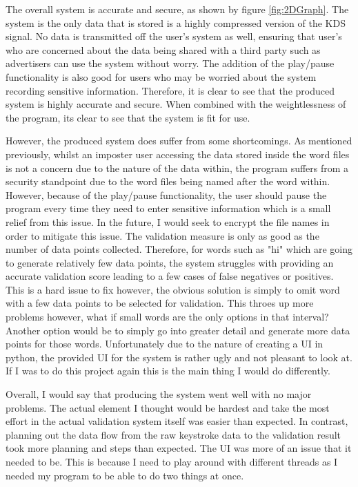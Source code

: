\documentclass[10pt,a4paper]{report}
\begin{document}
The overall system is accurate and secure, as shown by figure \ref{fig:2DGraph}. The system is the only data that is stored is a highly compressed version of the KDS signal. No data is transmitted off the user's system as well, ensuring that user's who are concerned about the data being shared with a third party such as advertisers can use the system without worry. The addition of the play/pause functionality is also good for users who may be worried about the system recording sensitive information. Therefore, it is clear to see that the produced system is highly accurate and secure. When combined with the weightlessness of the program, its clear to see that the system is fit for use.

However, the produced system does suffer from some shortcomings. As mentioned previously, whilst an imposter user accessing the data stored inside the word files is not a concern due to the nature of the data within, the program suffers from a security standpoint due to the word files being named after the word within. However, because of the play/pause functionality, the user should pause the program every time they need to enter sensitive information which is a small relief from this issue. In the future, I would seek to encrypt the file names in order to mitigate this issue. The validation measure is only as good as the number of data points collected. Therefore, for words such as "hi" which are going to generate relatively few data points, the system struggles with providing an accurate validation score leading to a few cases of false negatives or positives. This is a hard issue to fix however, the obvious solution is simply to omit word with a few data points to be selected for validation. This throes up more problems however, what if small words are the only options in that interval? Another option would be to simply go into greater detail and generate more data points for those words. Unfortunately due to the nature of creating a UI in python, the provided UI for the system is rather ugly and not pleasant to look at. If I was to do this project again this is the main thing I would do differently.

Overall, I would say that producing the system went well with no major problems. The actual element I thought would be hardest and take the most effort in the actual validation system itself was easier than expected. In contrast, planning out the data flow from the raw keystroke data to the validation result took more planning and steps than expected. The UI was more of an issue that it needed to be. This is because  I need to play around with different threads as I needed my program to be able to do two things at once. 
\end{document}
